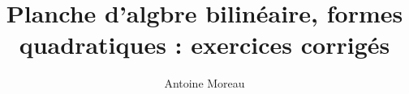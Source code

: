 \documentclass[a4paper,10pt]{article}
\title{Planche d'alg\g{e}bre bilin\'eaire, formes quadratiques : exercices corrig\'es}
\author{Antoine Moreau}
\begin{document}
\maketitle

\begin{abstract}

\end{abstract}


\end{document}
